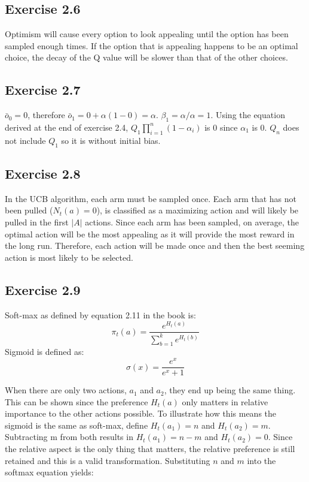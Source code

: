 \subsection{Exercise 2.6}
Optimism will cause every option to look appealing until the option has been sampled enough times. If the option that is appealing happens to be an optimal choice, the decay of the Q value will be slower than that of the other choices.

\subsection{Exercise 2.7}
$\bar{o}_0 = 0$, therefore $\bar{o}_1 = 0 + \alpha(1-0) = \alpha$. $\beta_1 = \alpha/\alpha = 1$. Using the equation derived at the end of exercise 2.4,  $Q_1\prod\limits_{i=1}^n(1-\alpha_i)$ is 0 since $\alpha_1$ is 0. $Q_n$ does not include $Q_1$ so it is without initial bias.

\subsection{Exercise 2.8}
In the UCB algorithm, each arm must be sampled once. Each arm that has not been pulled ($N_t(a) = 0$), is classified as a maximizing action and will likely be pulled in the first $|A|$ actions. Since each arm has been sampled, on average, the optimal action will be the most appealing as it will provide the most reward in the long run. Therefore, each action will be made once and then the best seeming action is most likely to be selected.

\subsection{Exercise 2.9}
Soft-max as defined by equation 2.11 in the book is:
\begin{equation}
  \pi_t(a) = \frac{e^{H_t(a)}}{\sum_{b=1}^{k}e^{H_t(b)}}
\end{equation}
Sigmoid is defined as:
\begin{equation}
  \sigma(x) = \frac{e^x}{e^x+1}
\end{equation}

When there are only two actions, $a_1$ and $a_2$, they end up being the same thing. This can be shown since the preference $H_t(a)$ only matters in relative importance to the other actions possible. To illustrate how this means the sigmoid is the same as soft-max, define $H_t(a_1) = n$ and $H_t(a_2) = m$. Subtracting m from both results in $H_t(a_1) = n-m$ and $H_t(a_2) = 0$. Since the relative aspect is the only thing that matters, the relative preference is still retained and this is a valid transformation. Substituting $n$ and $m$ into the softmax equation yields:

